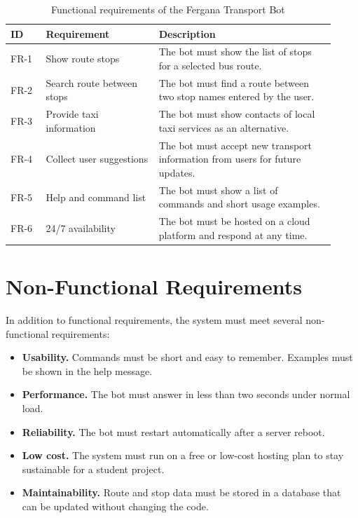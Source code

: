 \begin{table}[H]
\centering
\caption{Functional requirements of the Fergana Transport Bot}
\label{tab:reqs}
\label{tab:fr}  
\begin{tabular}{p{0.10\linewidth} p{0.32\linewidth} p{0.50\linewidth}}
\hline
\textbf{ID} & \textbf{Requirement} & \textbf{Description} \\
\hline
FR-1 & Show route stops & The bot must show the list of stops for a
selected bus route. \\
FR-2 & Search route between stops & The bot must find a route between
two stop names entered by the user. \\
FR-3 & Provide taxi information & The bot must show contacts of local
taxi services as an alternative. \\
FR-4 & Collect user suggestions & The bot must accept new transport
information from users for future updates. \\
FR-5 & Help and command list & The bot must show a list of commands
and short usage examples. \\
FR-6 & 24/7 availability & The bot must be hosted on a cloud platform
and respond at any time. \\
\hline
\end{tabular}
\end{table}

\section{Non-Functional Requirements}
\label{sec:nfr}

In addition to functional requirements, the system must meet several
non-functional requirements:

\begin{itemize}
  \item \textbf{Usability.} Commands must be short and easy to remember.
  Examples must be shown in the help message.
  \item \textbf{Performance.} The bot must answer in less than two
  seconds under normal load.
  \item \textbf{Reliability.} The bot must restart automatically after
  a server reboot.
  \item \textbf{Low cost.} The system must run on a free or low-cost
  hosting plan to stay sustainable for a student project.
  \item \textbf{Maintainability.} Route and stop data must be stored in
  a database that can be updated without changing the code.
\end{itemize}

